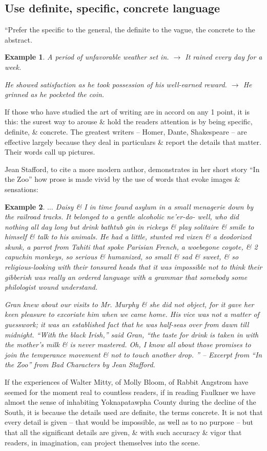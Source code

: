 \documentclass[oneside]{book}
\numberwithin{equation}{section}
\newtheorem{example}{Example}[chapter]
\begin{document}
\subsection{Use definite, specific, concrete language}
``Prefer the specific to the general, the definite to the vague, the concrete to the abstract.

\begin{example}
	A period of unfavorable weather set in. $\to$ It rained every day for a week.
	
	He showed satisfaction as he took possession of his well-earned reward. $\to$ He grinned as he pocketed the coin.
\end{example}
If those who have studied the art of writing are in accord on any 1 point, it is this: the surest way to arouse \& hold the readers attention is by being specific, definite, \& concrete. The greatest writers -- Homer, Dante, Shakespeare -- are effective largely because they deal in particulars \& report the details that matter. Their words call up pictures.

Jean Stafford, to cite a more modern author, demonstrates in her short story ``In the Zoo'' how prose is made vivid by the use of words that evoke images \& sensations:

\begin{example}
	$\ldots$ Daisy \& I in time found asylum in a small menagerie down by the railroad tracks. It belonged to a gentle alcoholic ne'er-do- well, who did nothing all day long but drink bathtub gin in rickeys \& play solitaire \& smile to himself \& talk to his animals. He had a little, stunted red vixen \& a deodorized skunk, a parrot from Tahiti that spoke Parisian French, a woebegone coyote, \& 2 capuchin monkeys, so serious \& humanized, so small \& sad \& sweet, \& so religious-looking with their tonsured heads that it was impossible not to think their gibberish was really an ordered language with a grammar that somebody some philologist wound understand.
	
	Gran knew about our visits to Mr. Murphy \& she did not object, for it gave her keen pleasure to excoriate him when we came home. His vice was not a matter of guesswork; it was an established fact that he was half-seas over from dawn till midnight. ``With the black Irish,'' said Gran, ``the taste for drink is taken in with the mother's milk \& is never mastered. Oh, I know all about those promises to join the temperance movement \& not to touch another drop. '' -- Excerpt from \textit{``In the Zoo''} from Bad Characters by Jean Stafford.
\end{example}
If the experiences of Walter Mitty, of Molly Bloom, of Rabbit Angstrom have seemed for the moment real to countless readers, if in reading Faulkner we have almost the sense of inhabiting Yoknapatawpha County during the decline of the South, it is because the details used are definite, the terms concrete. It is not that every detail is given -- that would be impossible, as well as to no purpose -- but that all the significant details are given, \& with such accuracy \& vigor that readers, in imagination, can project themselves into the scene.
\end{document}
